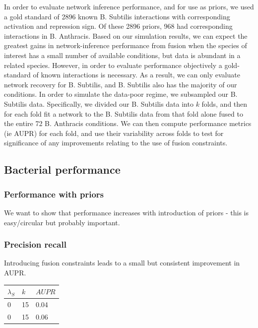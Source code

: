 \documentclass[11pt]{article}
\begin{document}
In order to evaluate network inference performance, and for use as priors, we used a gold standard of 2896 known B. Subtilis interactions with corresponding activation and repression sign. Of these 2896 priors, 968 had corresponding interactions in B. Anthracis. Based on our simulation results, we can expect the greatest gains in network-inference performance from fusion when the species of interest has a small number of available conditions, but data is abundant in a related species. However, in order to evaluate performance objectively a gold-standard of known interactions is necessary. As a result, we can only evaluate network recovery for B. Subtilis, and B. Subtilis also has the majority of our conditions. In order to simulate the data-poor regime, we subsampled our B. Subtilis data. Specifically, we divided our B. Subtilis data into $k$ folds, and then for each fold fit a network to the B. Subtilis data from that fold alone fused to the entire 72 B. Anthracis conditions. We can then compute performance metrics (ie AUPR) for each fold, and use their variability across folds to test for significance of any improvements relating to the use of fusion constraints. 

\subsection{Bacterial performance}
\subsubsection{Performance with priors}
We want to show that performance increases with introduction of priors - this is easy/circular but probably important.

\subsubsection{Precision recall}
Introducing fusion constraints leads to a small but consistent improvement in AUPR.


\begin{center}
  \begin{tabular}{ l | l | l }
    \hline
    $\lambda_S$ & $k$ & $AUPR$ \\ \hline
    0 & 15 & 0.04 \\
    0 & 15 & 0.06 \\
    \hline
  \end{tabular}
\end{center}
\end{document}

